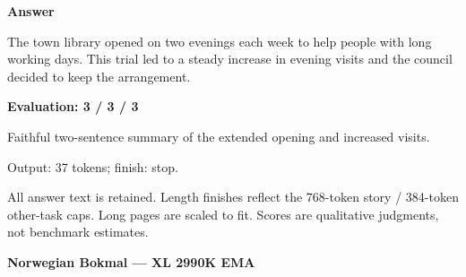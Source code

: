 \documentclass[10pt]{article}
\begin{document}
{\begin{minipage}{\textwidth}
\textbf{Answer}\par The town library opened on two evenings each week to help people with long working days. This trial led to a steady increase in evening visits and the council decided to keep the arrangement.\par\smallskip
\textbf{Evaluation: 3 / 3 / 3}\par Faithful two-sentence summary of the extended opening and increased visits.
\par {\color{gray} Output: 37 tokens; finish: stop.}\par
\medskip\footnotesize All answer text is retained. Length finishes reflect the 768-token story / 384-token other-task caps. Long pages are scaled to fit. Scores are qualitative judgments, not benchmark estimates.
\end{minipage}}%
\noindent\ifdim\dimexpr\ht\languagepage+\dp\languagepage\relax>0.93\textheight%
\resizebox*{!}{0.93\textheight}{\usebox{\languagepage}}%
\else\usebox{\languagepage}\fi%
\clearpage
{\Large\bfseries Norwegian Bokmal --- XL 2990K EMA}\par\smallskip
\end{document}
